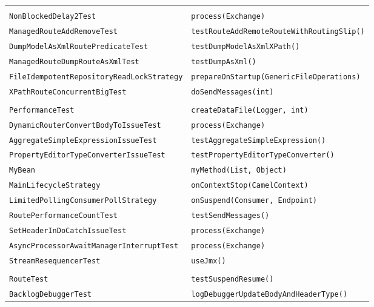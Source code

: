 \begin{center}
\begin{longtable}{ll}
\raisebox{-13pt}{\shortstack{\lstinline/AsyncEndpointRedeliveryErrorHandler/-\\\lstinline/NonBlockedDelay2Test/}}&{\lstinline/process(Exchange)/}\\
\lstinline/ManagedRouteAddRemoveTest/&{\lstinline/testRouteAddRemoteRouteWithRoutingSlip()/}\\
\lstinline/DumpModelAsXmlRoutePredicateTest/&{\lstinline/testDumpModelAsXmlXPath()/}\\
\lstinline/ManagedRouteDumpRouteAsXmlTest/&{\lstinline/testDumpAsXml()/}\\
\lstinline/FileIdempotentRepositoryReadLockStrategy/&{\lstinline/prepareOnStartup(GenericFileOperations)/}\\
\lstinline/XPathRouteConcurrentBigTest/&{\lstinline/doSendMessages(int)/}\\
\raisebox{-13pt}{\shortstack{\lstinline/TokenPairIteratorSplitChoice/-\\\lstinline/PerformanceTest/}}&{\lstinline/createDataFile(Logger, int)/}\\
\lstinline/DynamicRouterConvertBodyToIssueTest/&{\lstinline/process(Exchange)/}\\
\lstinline/AggregateSimpleExpressionIssueTest/&{\lstinline/testAggregateSimpleExpression()/}\\
\lstinline/PropertyEditorTypeConverterIssueTest/&{\lstinline/testPropertyEditorTypeConverter()/}\\
\lstinline/MyBean/&{\lstinline/myMethod(List, Object)/}\\
\lstinline/MainLifecycleStrategy/&{\lstinline/onContextStop(CamelContext)/}\\
\lstinline/LimitedPollingConsumerPollStrategy/&{\lstinline/onSuspend(Consumer, Endpoint)/}\\
\lstinline/RoutePerformanceCountTest/&{\lstinline/testSendMessages()/}\\
\lstinline/SetHeaderInDoCatchIssueTest/&{\lstinline/process(Exchange)/}\\
\lstinline/AsyncProcessorAwaitManagerInterruptTest/&{\lstinline/process(Exchange)/}\\
\lstinline/StreamResequencerTest/&{\lstinline/useJmx()/}\\
\raisebox{-13pt}{\shortstack{\lstinline/DefaultCamelContextSuspendResume/-\\\lstinline/RouteTest/}}&{\lstinline/testSuspendResume()/}\\
\lstinline/BacklogDebuggerTest/&{\lstinline/logDebuggerUpdateBodyAndHeaderType()/}\\

\end{longtable}
\end{center}
